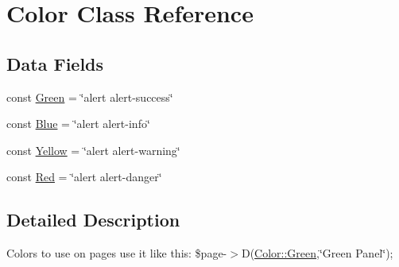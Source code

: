 \hypertarget{class_color}{\section{Color Class Reference}
\label{class_color}
}
\subsection*{Data Fields}
\begin{DoxyCompactItemize}
\item 
const \hyperlink{class_color_ac119844ee984b491286742de94976fa3}{Green} = \char`\"{}alert alert-\/success\char`\"{}
\item 
const \hyperlink{class_color_a3fe2e9935cc0f170c80afcf219c9b72d}{Blue} = \char`\"{}alert alert-\/info\char`\"{}
\item 
const \hyperlink{class_color_a0c6b6d8bcb388ac24174b8a8e8910d4d}{Yellow} = \char`\"{}alert alert-\/warning\char`\"{}
\item 
const \hyperlink{class_color_ad3fcb7b82c3f5eb778db8c50e4f6650c}{Red} = \char`\"{}alert alert-\/danger\char`\"{}
\end{DoxyCompactItemize}


\subsection{Detailed Description}
Colors to use on pages use it like this\-: \$page-\/$>$D(\hyperlink{class_color_ac119844ee984b491286742de94976fa3}{Color\-::\-Green},\char`\"{}\-Green Panel\char`\"{}); 

